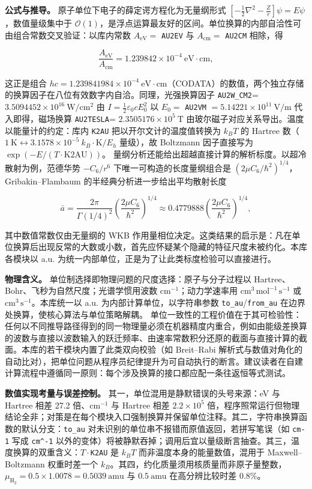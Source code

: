 \documentclass[
]{ctexbook}
\begin{document}
\textbf{公式与推导。} 原子单位下电子的薛定谔方程化为无量纲形式
\([-\frac12\nabla^{2}-\frac{Z}{r}]\psi=E\psi\)，数值量级集中于
\(\mathcal{O}(1)\)，是浮点运算最友好的区间。单位换算的内部自洽性可由组合常数交叉验证：以库内常数
\(A_{\mathrm{eV}}=\) \texttt{AU2EV} 与 \(A_{\mathrm{cm}}=\)
\texttt{AU2CM} 相除，得

\[\frac{A_{\mathrm{eV}}}{A_{\mathrm{cm}}}=1.239842\times10^{-4}\ \mathrm{eV\cdot cm},\]

这正是组合
\(hc=1.239841984\times10^{-4}\ \mathrm{eV\cdot cm}\)（CODATA）的数值，两个独立存储的换算因子在八位有效数字内自洽。同理，光强换算因子
\texttt{AU2W\_CM2}= \(3.5094452\times10^{16}\ \mathrm{W/cm^{2}}\) 由
\(I=\frac12\varepsilon_0 c E_0^{2}\) 以 \(E_0=\) \texttt{AU2VM}
\(=5.14221\times10^{11}\ \mathrm{V/m}\) 代入即得，磁场换算
\texttt{AU2TESLA}= \(2.3505176\times10^{5}\ \mathrm{T}\)
由玻尔磁子对应关系导出。温度以能量计的约定：库内 \texttt{K2AU}
把以开尔文计的温度值转换为 \(k_B T\) 的 Hartree
数（\(1\ \mathrm{K}\leftrightarrow3.1578\times10^{-5}\ k_B\cdot\mathrm{K}/E_h\)
量级），故 Boltzmann 因子直接写为 \(\exp(-E/(T\cdot\mathrm{K2AU}))\)。
量纲分析还能给出超越直接计算的解析标度。以超冷散射为例，范德华势
\(-C_6/r^{6}\) 下唯一可构造的长度量纲组合是
\((2\mu C_6/\hbar^{2})^{1/4}\)，Gribakin--Flambaum
的半经典分析进一步给出平均散射长度

\[\bar{a}=\frac{2\pi}{\Gamma(1/4)^{2}}\left(\frac{2\mu C_6}{\hbar^{2}}\right)^{1/4}\approx0.4779888\left(\frac{2\mu C_6}{\hbar^{2}}\right)^{1/4},\]

其中数值常数仅由无量纲的 WKB
作用量相位决定。这类结果的启示是：凡在单位换算后出现反常的大数或小数，首先应怀疑某个隐藏的特征尺度未被约化。本库各模块以
a.u. 为统一内部单位，正是为了让此类标度检验可以直接进行。

\textbf{物理含义。} 单位制选择即物理问题的尺度选择：原子与分子过程以
Hartree、Bohr、飞秒为自然尺度；光谱学惯用波数
\(\mathrm{cm^{-1}}\)；动力学速率用 \(\mathrm{cm^{3}\,mol^{-1}\,s^{-1}}\)
或 \(\mathrm{cm^{3}\,s^{-1}}\)。本库统一以 a.u.
为内部计算单位，以字符串参数 \texttt{to\_au}/\texttt{from\_au}
在边界处换算，使核心算法与单位策略解耦。
单位一致性的工程价值在于其可检验性：任何以不同推导路径得到的同一物理量必须在机器精度内重合，例如由能级差换算的波数与直接以波数输入的跃迁频率、由速率常数积分还原的截面与直接计算的截面。本库的若干模块内置了此类双向校验（如
Breit--Rabi
解析式与数值对角化的自动比对），把单位问题从程序员纪律提升为可自动执行的断言。建议读者在自建计算流程中遵循同一原则：每个涉及换算的接口都应配一条往返恒等式测试。

\textbf{数值实现考量与误差控制。} 其一，单位混用是静默错误的头号来源：eV
与 Hartree 相差 27.2 倍、\(\mathrm{cm^{-1}}\) 与 Hartree 相差
\(2.2\times10^{5}\)
倍，程序照常运行但物理结论全非；对策是在每个模块入口强制换算并保留单位注释。其二，字符串换算函数的默认分支：\texttt{to\_au}
对未识别的单位串不报错而原值返回，若拼写笔误（如 \texttt{cm-1} 写成
\texttt{cm\^{}-1}
以外的变体）将被静默吞掉；调用后宜以量级断言抽查。其三，温度换算的双重含义：\(T\cdot\)\texttt{K2AU}
是 \(k_BT\) 而非温度本身的能量数值，混用于 Maxwell--Boltzmann
权重时差一个
\(k_B\)。其四，约化质量须用核质量而非原子量整数，\(\mu_{\mathrm{H_2}}=0.5\times1.0078=0.5039\ \mathrm{amu}\)
与 \(0.5\ \mathrm{amu}\) 在高分辨比较时差 \(0.8\%\)。
\end{document}
